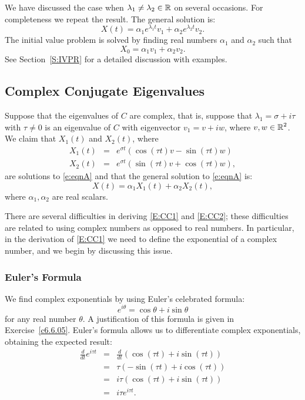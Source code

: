 \documentclass{ximera}
\begin{document}
We have discussed the case when $\lambda_1\neq\lambda_2\in\mbox{$\Bbb{R}$}$ on several
occasions.  For completeness we repeat the result.  The general solution is:
\begin{equation}  \label{E:RD2}
X(t) = \alpha_1 e^{\lambda_1 t}v_1 + \alpha_2 e^{\lambda_2 t}v_2.
\end{equation}
The initial value problem is solved by finding real numbers $\alpha_1$ and
$\alpha_2$ such that
\[
X_0 = \alpha_1 v_1 + \alpha_2 v_2.
\]
See Section~\ref{S:IVPR} for a detailed discussion with examples.

\subsection*{Complex Conjugate Eigenvalues}

Suppose that the eigenvalues of $C$ are complex, that is, suppose that
$\lambda_1= \sigma+i\tau$ with $\tau\neq 0$ is an eigenvalue of $C$ with
eigenvector $v_1=v+iw$, where $v,w\in\mbox{$\Bbb{R}$}^2$.  We claim that
$X_1(t)$ and $X_2(t)$, where
\begin{equation}  \label{E:CC1}
\begin{array}{rcl}
X_1(t) & = & e^{\sigma t}(\cos(\tau t)v -\sin(\tau t)w)\\
X_2(t) & = & e^{\sigma t}(\sin(\tau t)v +\cos(\tau t)w),
\end{array}
\end{equation}
are solutions to \eqref{e:eqnA} and that the general
solution to \eqref{e:eqnA} is:
\begin{equation}  \label{E:CC2}
X(t) = \alpha_1 X_1(t) + \alpha_2 X_2(t),
\end{equation}
where $\alpha_1, \alpha_2$ are real scalars.

There are several difficulties in deriving \eqref{E:CC1} and \eqref{E:CC2}; these
difficulties are related to using complex numbers as opposed to real numbers.
In particular, in the derivation of \eqref{E:CC1} we need to define the
exponential of a complex number, and we begin by discussing this issue.

\subsubsection*{Euler's Formula}

We find complex exponentials by using Euler's celebrated formula:
\begin{equation}  \label{E:Euler}
e^{i\theta} = \cos\theta + i\sin\theta
\end{equation}
for any real number $\theta$.  A justification of this formula is
given in Exercise~\ref{c6.6.05}.   Euler's formula allows us to differentiate
complex exponentials, obtaining the expected result:
\begin{eqnarray*}
\frac{d}{dt}e^{i\tau t} & = &
\frac{d}{dt}(\cos(\tau t) + i\sin(\tau t))\\
& = & \tau(-\sin(\tau t) + i\cos(\tau t)) \\
& = & i\tau(\cos(\tau t) + i\sin(\tau t))\\
& = & i\tau e^{i\tau t}.
\end{eqnarray*}
\end{document}

